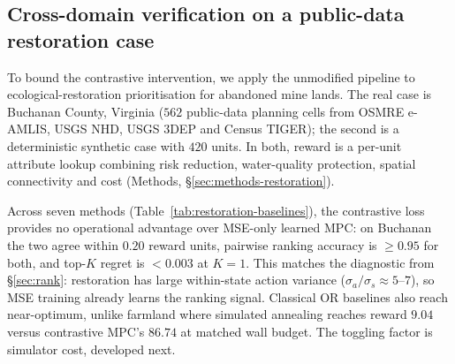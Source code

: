 \documentclass[11pt]{article}
\begin{document}
\subsection{Cross-domain verification on a public-data restoration case}\label{sec:cross-domain}

To bound the contrastive intervention, we apply the unmodified pipeline to ecological-restoration prioritisation for abandoned mine lands. The real case is Buchanan County, Virginia ($562$ public-data planning cells from OSMRE e-AMLIS, USGS NHD, USGS 3DEP and Census TIGER); the second is a deterministic synthetic case with $420$ units. In both, reward is a per-unit attribute lookup combining risk reduction, water-quality protection, spatial connectivity and cost (Methods, \S\ref{sec:methods-restoration}).

Across seven methods (Table~\ref{tab:restoration-baselines}), the contrastive loss provides no operational advantage over MSE-only learned MPC: on Buchanan the two agree within $0.20$ reward units, pairwise ranking accuracy is $\geq 0.95$ for both, and top-$K$ regret is $<0.003$ at $K{=}1$. This matches the diagnostic from \S\ref{sec:rank}: restoration has large within-state action variance ($\sigma_a/\sigma_s \approx 5$--$7$), so MSE training already learns the ranking signal. Classical OR baselines also reach near-optimum, unlike farmland where simulated annealing reaches reward $9.04$ versus contrastive MPC's $86.74$ at matched wall budget. The toggling factor is simulator cost, developed next.
\end{document}
